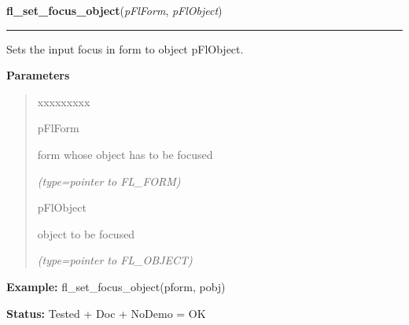 \hspace{.8\funcindent}\begin{boxedminipage}{\funcwidth}

    \raggedright \textbf{fl\_set\_focus\_object}(\textit{pFlForm}, \textit{pFlObject})

    \vspace{-1.5ex}

    \rule{\textwidth}{0.5\fboxrule}
\setlength{\parskip}{2ex}
    Sets the input focus in form to object pFlObject.

\setlength{\parskip}{1ex}
      \textbf{Parameters}
      \vspace{-1ex}

      \begin{quote}
        \begin{Ventry}{xxxxxxxxx}

          \item[pFlForm]

          form whose object has to be focused

            {\it (type=pointer to FL\_FORM)}

          \item[pFlObject]

          object to be focused

            {\it (type=pointer to FL\_OBJECT)}

        \end{Ventry}

      \end{quote}

\textbf{Example:} fl\_set\_focus\_object(pform, pobj)



\textbf{Status:} Tested + Doc + NoDemo = OK



    \end{boxedminipage}

    \label{xformslib:flbasic:fl_set_focus_object}

    \vspace{0.5ex}

